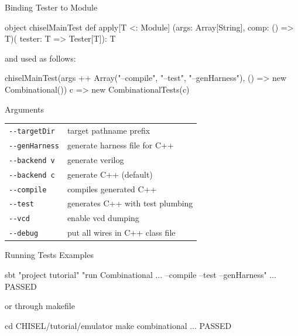 \documentclass[xcolor=pdflatex,dvipsnames,table]{beamer}
\begin{document}
\begin{frame}[fragile]{Binding Tester to Module}

\begin{scala}
object chiselMainTest {
  def apply[T <: Module]
    (args: Array[String], comp: () => T)(
     tester: T => Tester[T]): T
}
\end{scala}

\noindent and used as follows:

\begin{scala}
chiselMainTest(args  ++ Array("--compile", "--test",  "--genHarness"),  
               () => new Combinational()){ 
  c => new CombinationalTests(c) 
}
\end{scala}

\end{frame}

\begin{frame}[fragile]{ Arguments}
 
\begin{tabular}{ll}
\verb+--targetDir+ & target pathname prefix \\
\verb+--genHarness+ & generate harness file for C++ \\
\verb+--backend v+ & generate verilog \\ 
\verb+--backend c+ & generate C++ (default)\\
\verb+--compile+ & compiles generated C++ \\
\verb+--test+ & generates C++ with test plumbing  \\
\verb+--vcd+ & enable vcd dumping \\
\verb+--debug+ & put all wires in C++ class file \\
\end{tabular}

\end{frame}

\begin{frame}[fragile]{Running Tests Examples}

\begin{scala}
sbt "project tutorial" "run Combinational ... --compile --test --genHarness"
...
PASSED
\end{scala}

or through makefile

\begin{scala}
cd CHISEL/tutorial/emulator
make combinational
...
PASSED
\end{scala}
\end{frame}
\end{document}
